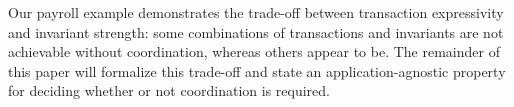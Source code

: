Our payroll example demonstrates the trade-off between transaction
expressivity and invariant strength: some combinations of transactions
and invariants are not achievable without coordination, whereas others
appear to be. The remainder of this paper will formalize this
trade-off and state an application-agnostic property for deciding
whether or not coordination is required.
